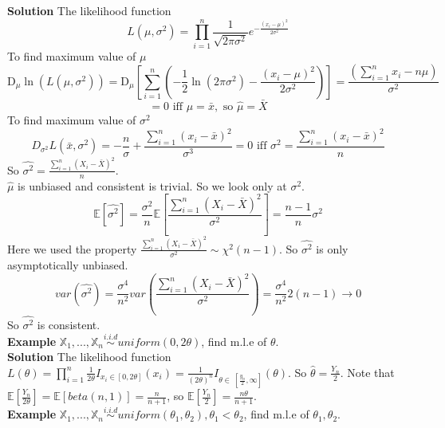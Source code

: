 \textbf{Solution} The likelihood function $$L(\mu, \sigma^2) = \prod_{i=1}^n \frac{1}{\sqrt{2\pi \sigma^2}}e^{-\frac{(x_i-\mu)^2}{2\sigma^2}}$$
To find maximum value of $\mu$
$$\mathrm{D}_\mu \ln( L(\mu, \sigma^2) ) =  \mathrm{D}_\mu [\sum_{i=1}^n (-\frac{1}{2}\ln(2\pi\sigma^2) - \frac{(x_i-\mu)^2}{2\sigma^2} )] = \frac{(\sum_{i=1}^n x_i-n\mu)}{\sigma^2}$$
$$= 0 \text{ iff } \mu = \bar{x}, \text{ so } \hat{\mu} = \bar{X}$$
To find maximum value of $\sigma^2$
$$D_{\sigma^2} L(\bar{x}, \sigma^2) = -\frac{n}{\sigma} + \frac{\sum_{i=1}^n(x_i - \bar{x})^2}{\sigma^3} = 0 \text{ iff } \sigma^2 = \frac{\sum_{i=1}^n(x_i - \bar{x})^2}{n}$$
So $\hat{\sigma^2} = \frac{\sum_{i=1}^n(X_i - \bar{X})^2}{n}$.\\

$\hat{\mu}$ is unbiased and consistent is trivial. So we look only at $\sigma^2$.
$$\mathbb{E}[\hat{\sigma^2}] = \frac{\sigma^2}{n}\mathbb{E}[\frac{\sum_{i=1}^n(X_i - \bar{X})^2}{\sigma^2}] = \frac{n-1}{n} \sigma^2$$
Here we used the property $\frac{\sum_{i=1}^n(X_i - \bar{X})^2}{\sigma^2} \sim \chi^2(n-1)$. So $\hat{\sigma^2}$ is only asymptotically unbiased.
$$var(\hat{\sigma^2}) = \frac{\sigma^4}{n^2} var( \frac{\sum_{i=1}^n(X_i - \bar{X})^2}{\sigma^2} ) = \frac{\sigma^4}{n^2}2(n-1) \to 0$$
So $\hat{\sigma^2}$ is consistent.\\

\textbf{Example} $\mathbb{X}_1, ..., \mathbb{X}_n \overset{i.i.d}{\sim} uniform(0, 2\theta)$, find m.l.e of $\theta$.\\

\textbf{Solution} The likelihood function $L(\theta) = \prod_{i=1}^n \frac{1}{2\theta}I_{x_i\in[0, 2\theta]}(x_i) = \frac{1}{(2\theta)^n}I_{\theta\in\ [\frac{y_n}{2}, \infty]}(\theta)$. So $\hat{\theta} = \frac{Y_n}{2}$. Note that $\mathbb{E}[\frac{Y_n}{2\theta}] = \mathbb{E}[ beta(n, 1) ] = \frac{n}{n+1}$, so $\mathbb{E}[\frac{Y_n}{2}] = \frac{n\theta}{n+1}$.\\

\textbf{Example}  $\mathbb{X}_1, ..., \mathbb{X}_n \overset{i.i.d}{\sim} uniform(\theta_1, \theta_2), \theta_1 < \theta_2$, find m.l.e of $\theta_1, \theta_2$.\\

